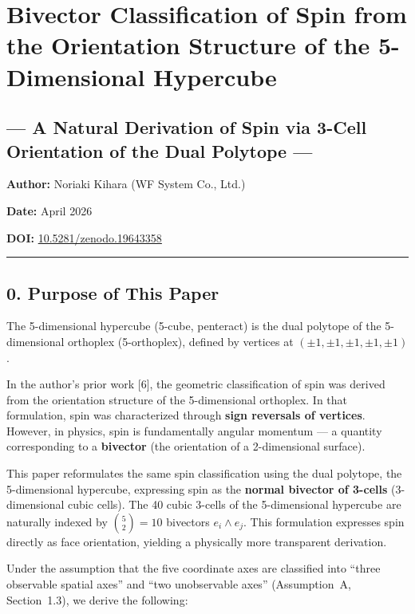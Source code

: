 \documentclass[a4paper,11pt]{article}
\begin{document}
\section*{Bivector Classification of Spin from the Orientation Structure of the 5-Dimensional Hypercube}

\subsection*{--- A Natural Derivation of Spin via 3-Cell Orientation of the Dual Polytope ---}

\textbf{Author:} Noriaki Kihara (WF System Co., Ltd.)

\textbf{Date:} April 2026

\textbf{DOI:}
\href{https://doi.org/10.5281/zenodo.19643358}{10.5281/zenodo.19643358}

\begin{center}\rule{0.5\linewidth}{0.5pt}\end{center}

\subsection*{0. Purpose of This Paper}

The 5-dimensional hypercube (5-cube, penteract) is the dual polytope of the 5-dimensional orthoplex (5-orthoplex), defined by vertices at $(\pm 1, \pm 1, \pm 1, \pm 1, \pm 1)$.

In the author's prior work [6], the geometric classification of spin was derived from the orientation structure of the 5-dimensional orthoplex. In that formulation, spin was characterized through \textbf{sign reversals of vertices}. However, in physics, spin is fundamentally angular momentum --- a quantity corresponding to a \textbf{bivector} (the orientation of a 2-dimensional surface).

This paper reformulates the same spin classification using the dual polytope, the 5-dimensional hypercube, expressing spin as the \textbf{normal bivector of 3-cells} (3-dimensional cubic cells). The 40 cubic 3-cells of the 5-dimensional hypercube are naturally indexed by $\binom{5}{2} = 10$ bivectors $e_i \wedge e_j$. This formulation expresses spin directly as face orientation, yielding a physically more transparent derivation.

Under the assumption that the five coordinate axes are classified into ``three observable spatial axes'' and ``two unobservable axes'' (Assumption~A, Section~1.3), we derive the following:
\end{document}
